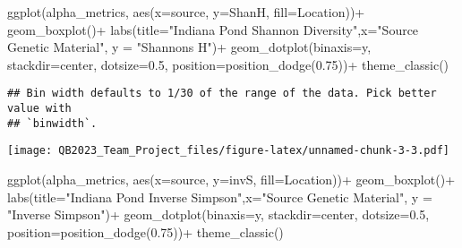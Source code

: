 \documentclass[
]{article}
\newenvironment{Shaded}{\begin{snugshade}}{\end{snugshade}}
\newcommand{\AttributeTok}[1]{\textcolor[rgb]{0.77,0.63,0.00}{#1}}
\newcommand{\FloatTok}[1]{\textcolor[rgb]{0.00,0.00,0.81}{#1}}
\newcommand{\FunctionTok}[1]{\textcolor[rgb]{0.00,0.00,0.00}{#1}}
\newcommand{\NormalTok}[1]{#1}
\newcommand{\SpecialCharTok}[1]{\textcolor[rgb]{0.00,0.00,0.00}{#1}}
\newcommand{\StringTok}[1]{\textcolor[rgb]{0.31,0.60,0.02}{#1}}
\begin{document}
\begin{Shaded}
\begin{Highlighting}[]
\FunctionTok{ggplot}\NormalTok{(alpha\_metrics, }\FunctionTok{aes}\NormalTok{(}\AttributeTok{x=}\NormalTok{source, }\AttributeTok{y=}\NormalTok{ShanH, }\AttributeTok{fill=}\NormalTok{Location))}\SpecialCharTok{+} 
  \FunctionTok{geom\_boxplot}\NormalTok{()}\SpecialCharTok{+}
  \FunctionTok{labs}\NormalTok{(}\AttributeTok{title=}\StringTok{"Indiana Pond Shannon Diversity"}\NormalTok{,}\AttributeTok{x=}\StringTok{"Source Genetic Material"}\NormalTok{, }\AttributeTok{y =} \StringTok{"Shannon\textquotesingle{}s H"}\NormalTok{)}\SpecialCharTok{+}
  \FunctionTok{geom\_dotplot}\NormalTok{(}\AttributeTok{binaxis=}\StringTok{\textquotesingle{}y\textquotesingle{}}\NormalTok{, }\AttributeTok{stackdir=}\StringTok{\textquotesingle{}center\textquotesingle{}}\NormalTok{, }\AttributeTok{dotsize=}\FloatTok{0.5}\NormalTok{, }\AttributeTok{position=}\FunctionTok{position\_dodge}\NormalTok{(}\FloatTok{0.75}\NormalTok{))}\SpecialCharTok{+}
  \FunctionTok{theme\_classic}\NormalTok{()}
\end{Highlighting}
\end{Shaded}

\begin{verbatim}
## Bin width defaults to 1/30 of the range of the data. Pick better value with
## `binwidth`.
\end{verbatim}

\texttt{[image: QB2023\_Team\_Project\_files/figure-latex/unnamed-chunk-3-3.pdf]}

\begin{Shaded}
\begin{Highlighting}[]
\FunctionTok{ggplot}\NormalTok{(alpha\_metrics, }\FunctionTok{aes}\NormalTok{(}\AttributeTok{x=}\NormalTok{source, }\AttributeTok{y=}\NormalTok{invS, }\AttributeTok{fill=}\NormalTok{Location))}\SpecialCharTok{+} 
  \FunctionTok{geom\_boxplot}\NormalTok{()}\SpecialCharTok{+}
  \FunctionTok{labs}\NormalTok{(}\AttributeTok{title=}\StringTok{"Indiana Pond Inverse Simpson"}\NormalTok{,}\AttributeTok{x=}\StringTok{"Source Genetic Material"}\NormalTok{, }\AttributeTok{y =} \StringTok{"Inverse Simpson"}\NormalTok{)}\SpecialCharTok{+}
  \FunctionTok{geom\_dotplot}\NormalTok{(}\AttributeTok{binaxis=}\StringTok{\textquotesingle{}y\textquotesingle{}}\NormalTok{, }\AttributeTok{stackdir=}\StringTok{\textquotesingle{}center\textquotesingle{}}\NormalTok{, }\AttributeTok{dotsize=}\FloatTok{0.5}\NormalTok{, }\AttributeTok{position=}\FunctionTok{position\_dodge}\NormalTok{(}\FloatTok{0.75}\NormalTok{))}\SpecialCharTok{+}
  \FunctionTok{theme\_classic}\NormalTok{()}
\end{Highlighting}
\end{Shaded}
\end{document}
